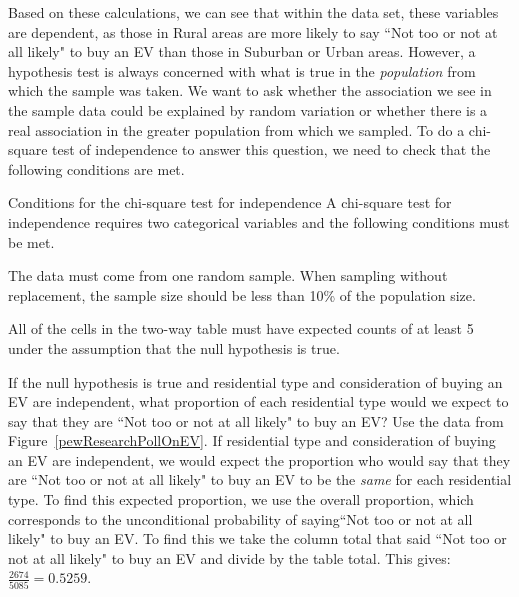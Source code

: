 Based on these calculations, we can see that within the data set, these variables are dependent, as those in Rural areas are more likely to say ``Not too or not at all likely" to buy an EV than those in Suburban or Urban areas.  However, a hypothesis test is always concerned with what is true in the \emph{population} from which the sample was taken.  We want to ask whether the association we see in the sample data could be explained by random variation or whether there is a real association in the greater population from which we sampled.  To do a chi-square test of independence to answer this question, we need to check that the following conditions are met.

\begin{onebox}{Conditions for the chi-square test for independence}
A chi-square test for independence requires two categorical variables and the following conditions must be met.\vspace{-1mm}
\begin{description}
\setlength{\itemsep}{0mm}
\item[Independence.] The data must come from one random sample. When sampling without replacement, the sample size should be less than 10\% of the population size.  
\item[Large expected counts.] All of the cells in the two-way table must have expected counts of at least 5 under the assumption that the null hypothesis is true.
\end{description}
\end{onebox}


\begin{examplewrap}
\begin{nexample}{If the null hypothesis is true and residential type and consideration of buying an EV are independent, what proportion of each residential type would we expect to say that they are ``Not too or not at all likely" to buy an EV?  Use the data from Figure~\ref{pewResearchPollOnEV}.}
If residential type and consideration of buying an EV are independent, we would expect the proportion who would say that they are ``Not too or not at all likely"  to buy an EV to be the \emph{same} for each residential type.  To find this expected proportion, we use the overall proportion, which corresponds to the unconditional probability of saying``Not too or not at all likely" to buy an EV.  To find this we take the column total that said ``Not too or not at all likely" to buy an EV and divide by the table total.  This gives: $\frac{2674}{5085} = 0.5259$.
\end{nexample}
\end{examplewrap}

